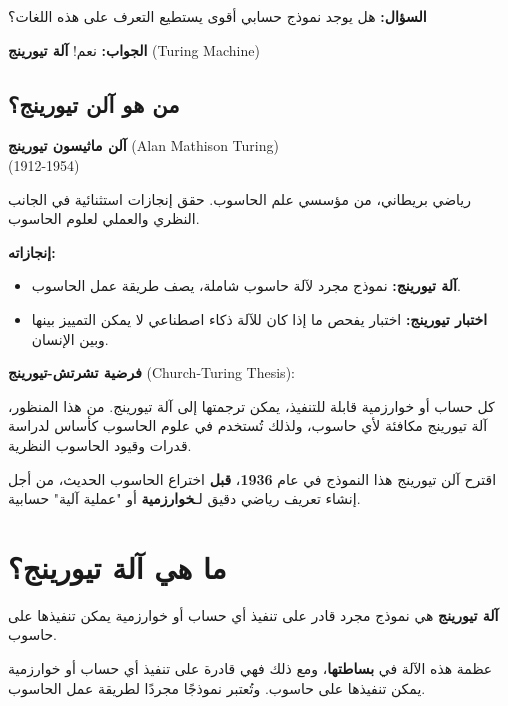 \documentclass[14pt]{extarticle}
\begin{document}
\textbf{السؤال:} هل يوجد نموذج حسابي أقوى يستطيع التعرف على هذه اللغات؟

\textbf{الجواب:} نعم! \textbf{آلة تيورينج} (\textenglish{Turing Machine})

\clearpage

\subsection{من هو آلن تيورينج؟}

\textbf{آلن ماثيسون تيورينج} (\textenglish{Alan Mathison Turing})\\
(1912-1954)

رياضي بريطاني، من مؤسسي علم الحاسوب. حقق إنجازات استثنائية في الجانب النظري والعملي لعلوم الحاسوب.

\textbf{إنجازاته:}
\begin{itemize}
    \item \textbf{آلة تيورينج:} نموذج مجرد لآلة حاسوب شاملة، يصف طريقة عمل الحاسوب.
    \item \textbf{اختبار تيورينج:} اختبار يفحص ما إذا كان للآلة ذكاء اصطناعي لا يمكن التمييز بينها وبين الإنسان.
\end{itemize}

\begin{boxAttention}
\textbf{فرضية تشرتش-تيورينج} (\textenglish{Church-Turing Thesis}):

كل حساب أو خوارزمية قابلة للتنفيذ، يمكن ترجمتها إلى آلة تيورينج. من هذا المنظور، آلة تيورينج مكافئة لأي حاسوب، ولذلك تُستخدم في علوم الحاسوب كأساس لدراسة قدرات وقيود الحاسوب النظرية.
\end{boxAttention}

اقترح آلن تيورينج هذا النموذج في عام \textbf{1936}، \textbf{قبل} اختراع الحاسوب الحديث، من أجل إنشاء تعريف رياضي دقيق لـ\textbf{خوارزمية} أو "عملية آلية" حسابية.

\clearpage

\section{ما هي آلة تيورينج؟}

\begin{boxDef}
\textbf{آلة تيورينج} هي نموذج مجرد قادر على تنفيذ أي حساب أو خوارزمية يمكن تنفيذها على حاسوب.

عظمة هذه الآلة في \textbf{بساطتها}، ومع ذلك فهي قادرة على تنفيذ أي حساب أو خوارزمية يمكن تنفيذها على حاسوب. وتُعتبر نموذجًا مجردًا لطريقة عمل الحاسوب.
\end{boxDef}
\end{document}
